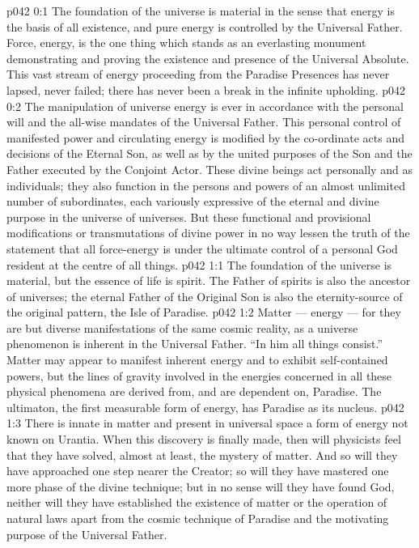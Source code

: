 \author{Mighty Messenger}
\vs p042 0:1 The foundation of the universe is material in the sense that energy is the basis of all existence, and pure energy is controlled by the Universal Father. Force, energy, is the one thing which stands as an everlasting monument demonstrating and proving the existence and presence of the Universal Absolute. This vast stream of energy proceeding from the Paradise Presences has never lapsed, never failed; there has never been a break in the infinite upholding.
\vs p042 0:2 The manipulation of universe energy is ever in accordance with the personal will and the all\hyp{}wise mandates of the Universal Father. This personal control of manifested power and circulating energy is modified by the co\hyp{}ordinate acts and decisions of the Eternal Son, as well as by the united purposes of the Son and the Father executed by the Conjoint Actor. These divine beings act personally and as individuals; they also function in the persons and powers of an almost unlimited number of subordinates, each variously expressive of the eternal and divine purpose in the universe of universes. But these functional and provisional modifications or transmutations of divine power in no way lessen the truth of the statement that all force\hyp{}energy is under the ultimate control of a personal God resident at the centre of all things.
\vs p042 1:1 The foundation of the universe is material, but the essence of life is spirit. The Father of spirits is also the ancestor of universes; the eternal Father of the Original Son is also the eternity\hyp{}source of the original pattern, the Isle of Paradise.
\vs p042 1:2 Matter --- energy --- for they are but diverse manifestations of the same cosmic reality, as a universe phenomenon is inherent in the Universal Father. “In him all things consist.” Matter may appear to manifest inherent energy and to exhibit self\hyp{}contained powers, but the lines of gravity involved in the energies concerned in all these physical phenomena are derived from, and are dependent on, Paradise. The ultimaton, the first measurable form of energy, has Paradise as its nucleus.
\vs p042 1:3 \pc There is innate in matter and present in universal space a form of energy not known on Urantia. When this discovery is finally made, then will physicists feel that they have solved, almost at least, the mystery of matter. And so will they have approached one step nearer the Creator; so will they have mastered one more phase of the divine technique; but in no sense will they have found God, neither will they have established the existence of matter or the operation of natural laws apart from the cosmic technique of Paradise and the motivating purpose of the Universal Father.
